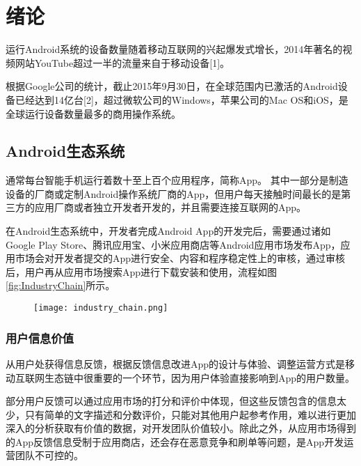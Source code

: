 
\chapter{绪论}
\label{chap:intro}

运行Android系统的设备数量随着移动互联网的兴起爆发式增长，2014年著名的视频网站YouTube超过一半的流量来自于移动设备[1]。

根据Google公司的统计，截止2015年9月30日，在全球范围内已激活的Android设备已经达到14亿台[2]，超过微软公司的Windows，苹果公司的Mac OS和iOS，是全球运行设备数量最多的商用操作系统。

\section{Android生态系统}

通常每台智能手机运行着数十至上百个应用程序，简称App。
其中一部分是制造设备的厂商或定制Android操作系统厂商的App，但用户每天接触时间最长的是第三方的应用厂商或者独立开发者开发的，并且需要连接互联网的App。

在Android生态系统中，开发者完成Android App的开发完后，需要通过诸如Google Play Store、腾讯应用宝、小米应用商店等Android应用市场发布App，应用市场会对开发者提交的App进行安全、内容和程序稳定性上的审核，通过审核后，用户再从应用市场搜索App进行下载安装和使用，流程如图\ref{fig:IndustryChain}所示。

\begin{figure}[!htp]
	\centering
	\texttt{[image: industry\_chain.png]}
\end{figure}

\subsection{用户信息价值}

从用户处获得信息反馈，根据反馈信息改进App的设计与体验、调整运营方式是移动互联网生态链中很重要的一个环节，因为用户体验直接影响到App的用户数量。

部分用户反馈可以通过应用市场的打分和评价中体现，但这些反馈包含的信息太少，只有简单的文字描述和分数评价，只能对其他用户起参考作用，难以进行更加深入的分析获取有价值的数据，对开发团队价值较小。除此之外，从应用市场得到的App反馈信息受制于应用商店，还会存在恶意竞争和刷单等问题，是App开发运营团队不可控的。

